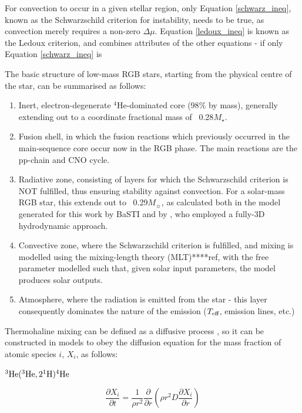 \documentclass[usenatbib]{mnras}
\begin{document}

For convection to occur in a given stellar region, only Equation \ref{schwarz_ineq}, known as the Schwarzschild criterion for instability, needs to be true, as convection merely requires a non-zero $\Delta\mu$. Equation \ref{ledoux_ineq} is known as the Ledoux criterion, and combines attributes of the other equations - if only Equation \ref{schwarz_ineq} is 

The basic structure of low-mass  RGB stars, starting from the physical centre of the star, can be summarised as follows:

\begin{enumerate}
\item Inert, electron-degenerate $^{4}$He-dominated core (98$\%$ by mass), generally extending out to a coordinate fractional mass of ~0.28$M_{\star}$.
\item Fusion shell, in which the fusion reactions which previously occurred in the main-sequence core occur now in the RGB phase. The main reactions are the pp-chain and CNO cycle.
\item Radiative zone, consisting of layers for which the Schwarzschild criterion is NOT fulfilled, thus ensuring stability against convection. For a solar-mass RGB star, this extends out to ~0.29$M_{\sun}$, as calculated both in the model generated for this work by BaSTI and by \citet{2006Sci...314.1580E}, who employed a fully-3D hydrodynamic approach.
\item Convective zone, where the Schwarzschild criterion is fulfilled, and mixing is modelled using the mixing-length theory (MLT)****ref, with the free parameter modelled such that, given solar input parameters, the model produces solar outputs.
\item Atmosphere, where the radiation is emitted from the star - this layer consequently dominates the nature of the emission ($T_{\textnormal{eff}}$, emission lines, etc.)
\end{enumerate}

Thermohaline mixing can be defined as a diffusive process \citep{1980A&A....91..175K}, so it can be constructed in models to obey the diffusion equation for the mass fraction of atomic species $i$, $X_{i}$, as follows:

$^{3}\textnormal{He}(^{3}\textnormal{He},2^{1}\textnormal{H})^{4}\textnormal{He}$

\begin{equation}
\frac{\partial X_{i}}{\partial t} = \frac{1}{\rho r^{2}}\frac{\partial}{\partial r} \left( \rho r^{2} D \frac{\partial X_{i}}{\partial r} \right)
\label{diffusion_eq}
\end{equation}
\end{document}
